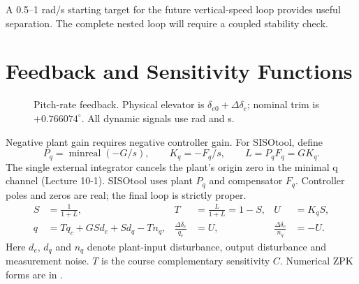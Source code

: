 \documentclass[a4paper,11pt]{article}
\newcommand{\file}[1]{\texttt{\detokenize{#1}}}
\begin{document}
A 0.5--1 rad/s starting target for the future vertical-speed loop provides useful separation. The complete nested loop will require a coupled stability check.

\section{Feedback and Sensitivity Functions}

\begin{figure}[H]\centering
{}
\caption{Pitch-rate feedback. Physical elevator is $\delta_{e0}+\Delta\delta_e$; nominal trim is $+0.766074^\circ$. All dynamic signals use rad and s.}
\end{figure}

Negative plant gain requires negative controller gain. For SISOtool, define
\begin{equation}
P_q=\operatorname{minreal}(-G/s),\qquad K_q=-F_q/s,\qquad L=P_qF_q=GK_q.
\end{equation}
The single external integrator cancels the plant's origin zero in the minimal q channel (Lecture 10-1). SISOtool uses plant $P_q$ and compensator $F_q$. Controller poles and zeros are real; the final loop is strictly proper.
\begin{align}
S&=\frac{1}{1+L},& T&=\frac{L}{1+L}=1-S,& U&=K_qS,\\
q&=Tq_c+GSd_e+Sd_q-Tn_q,&\frac{\Delta\delta_e}{q_c}&=U,&\frac{\Delta\delta_e}{n_q}&=-U.
\end{align}
Here $d_e$, $d_q$ and $n_q$ denote plant-input disturbance, output disturbance and measurement noise. $T$ is the course complementary sensitivity $C$. Numerical ZPK forms are in \file{zpk.txt}.
\end{document}
